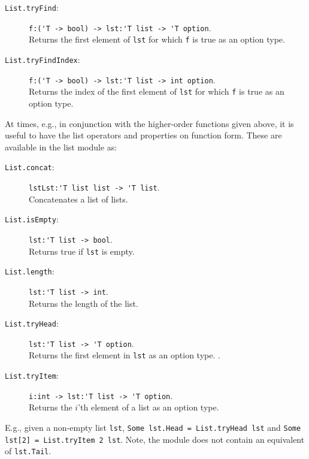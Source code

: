 \documentclass[fsharpNotes.tex]{subfiles}
\begin{document}
\begin{description}
\item[\texttt{List.tryFind}:] \lstinline{f:('T -> bool) -> lst:'T list -> 'T option}.~\\
  Returns the first element of \lstinline{lst} for which \lstinline{f} is true as an option type.
\item[\texttt{List.tryFindIndex}:] \lstinline{f:('T -> bool) -> lst:'T list -> int option}.~\\
  Returns the index of the first element of \lstinline{lst} for which \lstinline{f} is true as an option type.
\end{description}

\newpage
At times, e.g., in conjunction with the higher-order functions given above, it is useful to have the list operators and properties on function form. These are available in the list module as:
\begin{description}
\item[\texttt{List.concat}:]  \lstinline{lstLst:'T list list -> 'T list}.~\\
  Concatenates a list of lists.
\item[\texttt{List.isEmpty}:]  \lstinline{lst:'T list -> bool}.~\\
  Returns true if \lstinline{lst} is empty.
\item[\texttt{List.length}:]  \lstinline{lst:'T list -> int}.~\\
  Returns the length of the list.
\item[\texttt{List.tryHead}:] \lstinline{lst:'T list -> 'T option}.~\\
  Returns the first element in \lstinline{lst} as an option type. .
\item[\texttt{List.tryItem}:]  \lstinline{i:int -> lst:'T list -> 'T option}.\label{item:listTryItem}~\\
  Returns the $i$'th element of a list as an option type.
\end{description}
E.g., given a non-empty list \lstinline{lst}, \lstinline{Some lst.Head = List.tryHead lst} and \lstinline{Some lst[2] = List.tryItem 2 lst}. Note, the module does not contain an equivalent of \lstinline{lst.Tail}.
\end{document}
